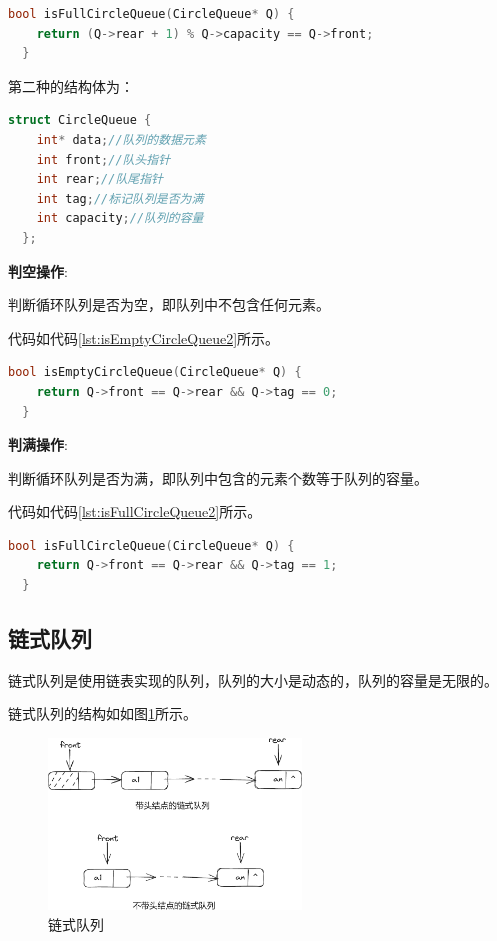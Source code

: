 \documentclass[lang=cn,newtx,10pt,scheme=chinese]{../elegantbook}
\begin{document}
\begin{lstlisting}[language=C++, caption={判断循环队列是否为满示例代码}, label={lst:isFullCircleQueue}]
  bool isFullCircleQueue(CircleQueue* Q) {
    return (Q->rear + 1) % Q->capacity == Q->front;
  }

\end{lstlisting}

第二种的结构体为：

\begin{lstlisting}[language=C++, caption={循环队列结构体定义}, label={lst:circleQueueStruct2}]
  struct CircleQueue {
    int* data;//队列的数据元素
    int front;//队头指针
    int rear;//队尾指针
    int tag;//标记队列是否为满
    int capacity;//队列的容量
  };
\end{lstlisting}

\textbf{判空操作}:

判断循环队列是否为空，即队列中不包含任何元素。

代码如代码\ref{lst:isEmptyCircleQueue2}所示。

\begin{lstlisting}[language=C++, caption={判断循环队列是否为空示例代码}, label={lst:isEmptyCircleQueue2}]
  bool isEmptyCircleQueue(CircleQueue* Q) {
    return Q->front == Q->rear && Q->tag == 0;
  }

\end{lstlisting}

\textbf{判满操作}:

判断循环队列是否为满，即队列中包含的元素个数等于队列的容量。

代码如代码\ref{lst:isFullCircleQueue2}所示。

\begin{lstlisting}[language=C++, caption={判断循环队列是否为满示例代码}, label={lst:isFullCircleQueue2}]
  bool isFullCircleQueue(CircleQueue* Q) {
    return Q->front == Q->rear && Q->tag == 1;
  }

\end{lstlisting}

\subsection{链式队列}

链式队列是使用链表实现的队列，队列的大小是动态的，队列的容量是无限的。

链式队列的结构如如图\ref{fig:linkQueue}所示。

\begin{figure}[!htbp]
  \centering
  \includegraphics[width=0.6\textwidth]{./figure/pdf/cropped/linkQueue.pdf}
  \caption{链式队列}
  \label{fig:linkQueue}
\end{figure}
\end{document}
